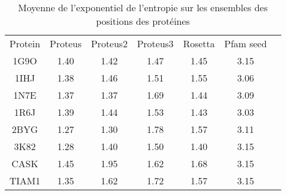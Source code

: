     \begin{table}[!htbp]
      \centering

      \begin{tabular}{ccccccc}

        \toprule
        Protein & Proteus &  Proteus2 &  Proteus3 & Rosetta & Pfam seed \\
        \cmidrule{1-6}
        1G9O  & 1.40 & 1.42 & 1.47 & 1.45 & 3.15  \\
        1IHJ  & 1.38 & 1.46 & 1.51 & 1.55 & 3.06  \\
        1N7E  & 1.37 & 1.37 & 1.69 & 1.44 & 3.09  \\
        1R6J  & 1.39 & 1.44 & 1.53 & 1.43 & 3.03  \\
        2BYG  & 1.27 & 1.30 & 1.78 & 1.57 & 3.11  \\
        3K82  & 1.28 & 1.40 & 1.50 & 1.40 & 3.15  \\
        CASK  & 1.45 & 1.95 & 1.62 & 1.68 & 3.15  \\
        TIAM1 & 1.35 & 1.62 & 1.72 & 1.57 & 3.15  \\
        \bottomrule

      \end{tabular}      
      \caption{Moyenne de l'exponentiel de l'entropie sur les ensembles des positions des protéines}
\label{tab:Entroie_PDZ}      
    \end{table}




 \clearpage
